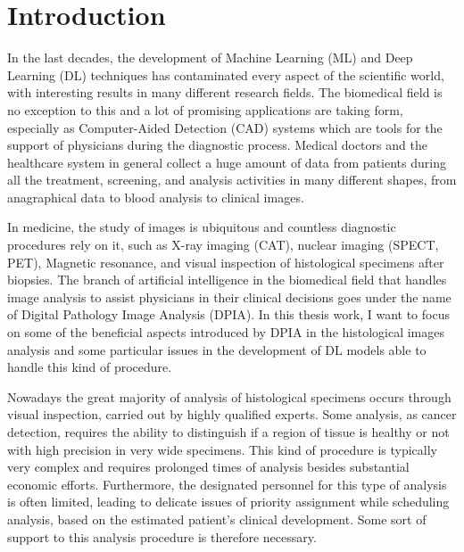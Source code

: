 \chapter*{Introduction}
In the last decades, the development of Machine Learning (ML) and Deep Learning (DL) techniques has contaminated every aspect of the scientific world, with interesting results in many different research fields. The biomedical field is no exception to this and a lot of promising applications are taking form, especially as Computer-Aided Detection (CAD) systems which are tools for the support of physicians during the diagnostic process. Medical doctors and the healthcare system in general collect a huge amount of data from patients during all the treatment, screening, and analysis activities in many different shapes, from anagraphical data to blood analysis to clinical images.

In medicine, the study of images is ubiquitous and countless diagnostic procedures rely on it, such as X-ray imaging (CAT), nuclear imaging (SPECT, PET), Magnetic resonance, and visual inspection of histological specimens after biopsies. The branch of artificial intelligence in the biomedical field that handles image analysis to assist physicians in their clinical decisions goes under the name of Digital Pathology Image Analysis (DPIA).
In this thesis work, I want to focus on some of the beneficial aspects introduced by DPIA in the histological images analysis and some particular issues in the development of DL models able to handle this kind of procedure.

Nowadays the great majority of analysis of histological specimens occurs through visual inspection, carried out by highly qualified experts. Some analysis, as cancer detection, requires the ability to distinguish if a region of tissue is healthy or not with high precision in very wide specimens. This kind of procedure is typically very complex and requires prolonged times of analysis besides substantial economic efforts. Furthermore, the designated personnel for this type of analysis is often limited, leading to delicate issues of priority assignment while scheduling analysis, based on the estimated patient's clinical development. Some sort of support to this analysis procedure is therefore necessary.


